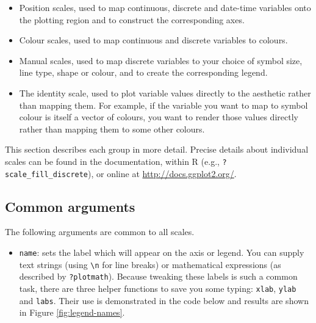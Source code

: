 \begin{itemize}
\itemsep1pt\parskip0pt
\item
  Position scales, used to map continuous, discrete and date-time
  variables onto the plotting region and to construct the corresponding
  axes.
\item
  Colour scales, used to map continuous and discrete variables to
  colours.
\item
  Manual scales, used to map discrete variables to your choice of symbol
  size, line type, shape or colour, and to create the corresponding
  legend.
\item
  The identity scale, used to plot variable values directly to the
  aesthetic rather than mapping them. For example, if the variable you
  want to map to symbol colour is itself a vector of colours, you want
  to render those values directly rather than mapping them to some other
  colours.
\end{itemize}

This section describes each group in more detail. Precise details about
individual scales can be found in the documentation, within R (e.g.,
\texttt{?scale\_fill\_discrete}), or online at
\url{http://docs.ggplot2.org/}.

\subsection{Common arguments}\label{sub:scale-arguments}

The following arguments are common to all scales.

\begin{itemize}
\itemsep1pt\parskip0pt
\item
  \texttt{name}: sets the label which will appear on the axis or legend.
  You can supply text strings (using \texttt{\textbackslash{}n} for line
  breaks) or mathematical expressions (as described by
  \texttt{?plotmath}). Because tweaking these labels is such a common
  task, there are three helper functions to save you some typing:
  \texttt{xlab}, \texttt{ylab} and \texttt{labs}. Their use is
  demonstrated in the code below and results are shown in Figure
  \ref{fig:legend-names}.  
\end{itemize}

